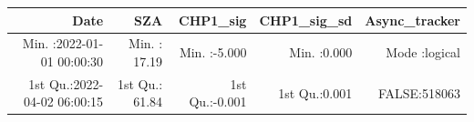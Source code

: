 \documentclass[
  10pt,
  a4paper,oneside]{article}
\begin{document}
\begin{longtable}[]{@{}rrrrr@{}}
\toprule
\begin{minipage}[b]{0.27\columnwidth}\raggedleft
Date\strut
\end{minipage} & \begin{minipage}[b]{0.15\columnwidth}\raggedleft
SZA\strut
\end{minipage} & \begin{minipage}[b]{0.15\columnwidth}\raggedleft
CHP1\_sig\strut
\end{minipage} & \begin{minipage}[b]{0.14\columnwidth}\raggedleft
CHP1\_sig\_sd\strut
\end{minipage} & \begin{minipage}[b]{0.14\columnwidth}\raggedleft
Async\_tracker\strut
\end{minipage}\tabularnewline
\midrule
\endhead
\begin{minipage}[t]{0.27\columnwidth}\raggedleft
Min. :2022-01-01 00:00:30\strut
\end{minipage} & \begin{minipage}[t]{0.15\columnwidth}\raggedleft
Min. : 17.19\strut
\end{minipage} & \begin{minipage}[t]{0.15\columnwidth}\raggedleft
Min. :-5.000\strut
\end{minipage} & \begin{minipage}[t]{0.14\columnwidth}\raggedleft
Min. :0.000\strut
\end{minipage} & \begin{minipage}[t]{0.14\columnwidth}\raggedleft
Mode :logical\strut
\end{minipage}\tabularnewline
\begin{minipage}[t]{0.27\columnwidth}\raggedleft
1st Qu.:2022-04-02 06:00:15\strut
\end{minipage} & \begin{minipage}[t]{0.15\columnwidth}\raggedleft
1st Qu.: 61.84\strut
\end{minipage} & \begin{minipage}[t]{0.15\columnwidth}\raggedleft
1st Qu.:-0.001\strut
\end{minipage} & \begin{minipage}[t]{0.14\columnwidth}\raggedleft
1st Qu.:0.001\strut
\end{minipage} & \begin{minipage}[t]{0.14\columnwidth}\raggedleft
FALSE:518063\strut
\end{minipage}\tabularnewline

\end{longtable}
\end{document}
